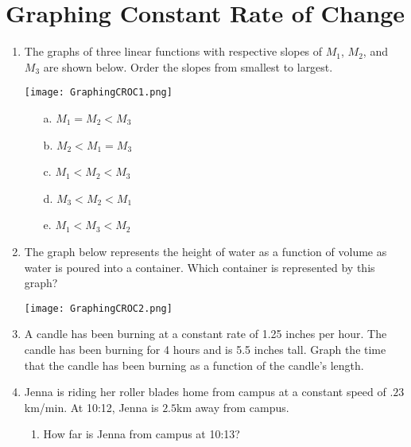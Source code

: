\documentclass[12pt]{report}
\begin{document}
\newcommand{\less}{\textless}
\newcommand{\greater}{\textgreater}
\newcommand{\reals}{\mathbb{R}}
\newcommand{\integers}{\mathbb{Z}}
\newcommand{\rationals}{\mathbb{Q}}
\newcommand{\dsp}{\displaystyle}

\section*{Graphing Constant Rate of Change}

\begin{enumerate}

\item  The graphs of three linear functions with respective slopes of $M_1$, $M_2$, and $M_3$ are shown below. Order the slopes from smallest to largest.
\begin{center}
	\texttt{[image: GraphingCROC1.png]}
\end{center}
\begin{enumerate}
\item [a.] $M_1 = M_2 < M_3$
\item [b.] $M_2 < M_1 = M_3$
\item [c.] $M_1 < M_2 < M_3$
\item [d.] $M_3 < M_2 < M_1$
\item [e.] $M_1 < M_3 < M_2$
\end{enumerate}
\pagebreak

\item The graph below represents the height of water as a function of volume as water is poured into a container. Which container is represented by this graph?
\vspace{0.2cm}
\begin{center}
	\texttt{[image: GraphingCROC2.png]}
\end{center}

\item A candle has been burning at a constant rate of 1.25 inches per hour. The candle has been burning for 4 hours and is 5.5 inches tall. Graph the time that the candle has been burning as a function of the candle's length. 

\item Jenna is riding her roller blades home from campus at a constant speed of $.23$km/min. At 10:12, Jenna is $2.5$km away from campus. 

\begin{enumerate}

\item How far is Jenna from campus at 10:13?


\end{enumerate}
\end{enumerate}
\end{document}
